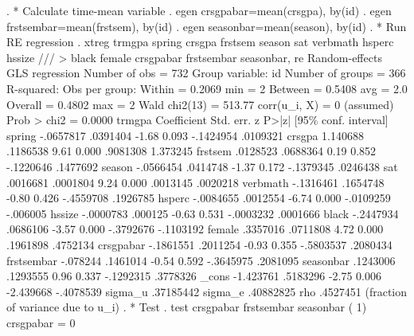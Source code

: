 . * Calculate time-mean variable
. egen crsgpabar=mean(crsgpa), by(id)
{\smallskip}
. egen frstsembar=mean(frstsem), by(id)
{\smallskip}
. egen seasonbar=mean(season), by(id)
{\smallskip}
. * Run RE regression
. xtreg trmgpa spring crsgpa frstsem season sat verbmath hsperc hssize ///
> black female crsgpabar frstsembar seasonbar, re
{\smallskip}
Random-effects GLS regression                   Number of obs     =        732
Group variable: id                              Number of groups  =        366
{\smallskip}
R-squared:                                      Obs per group:
     Within  = 0.2069                                         min =          2
     Between = 0.5408                                         avg =        2.0
     Overall = 0.4802                                         max =          2
{\smallskip}
                                                Wald chi2(13)     =     513.77
corr(u_i, X) = 0 (assumed)                      Prob > chi2       =     0.0000
{\smallskip}
      trmgpa {\VBAR} Coefficient  Std. err.      z    P>|z|     [95\% conf. interval]
      spring {\VBAR}  -.0657817   .0391404    -1.68   0.093    -.1424954    .0109321
      crsgpa {\VBAR}   1.140688   .1186538     9.61   0.000     .9081308    1.373245
     frstsem {\VBAR}   .0128523   .0688364     0.19   0.852    -.1220646    .1477692
      season {\VBAR}  -.0566454   .0414748    -1.37   0.172    -.1379345    .0246438
         sat {\VBAR}   .0016681   .0001804     9.24   0.000     .0013145    .0020218
    verbmath {\VBAR}  -.1316461   .1654748    -0.80   0.426    -.4559708    .1926785
      hsperc {\VBAR}  -.0084655   .0012554    -6.74   0.000    -.0109259    -.006005
      hssize {\VBAR}  -.0000783    .000125    -0.63   0.531    -.0003232    .0001666
       black {\VBAR}  -.2447934   .0686106    -3.57   0.000    -.3792676   -.1103192
      female {\VBAR}   .3357016   .0711808     4.72   0.000     .1961898    .4752134
   crsgpabar {\VBAR}  -.1861551   .2011254    -0.93   0.355    -.5803537    .2080434
  frstsembar {\VBAR}   -.078244   .1461014    -0.54   0.592    -.3645975    .2081095
   seasonbar {\VBAR}   .1243006   .1293555     0.96   0.337    -.1292315    .3778326
       _cons {\VBAR}  -1.423761   .5183296    -2.75   0.006    -2.439668   -.4078539
     sigma_u {\VBAR}  .37185442
     sigma_e {\VBAR}  .40882825
         rho {\VBAR}   .4527451   (fraction of variance due to u_i)
{\smallskip}
. * Test
. test crsgpabar frstsembar seasonbar
{\smallskip}
 ( 1)  crsgpabar = 0
